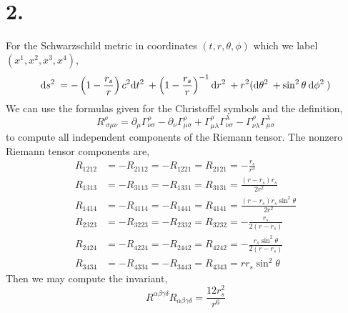 \documentclass[12pt]{article}
\begin{document}
\renewcommand{\sh}[1]{\left( 1 - \frac{r_s}{#1} \right)}

\section*{2.}

For the Schwarzschild metric in coordinates $(t, r, \theta, \phi)$ which we label $(x^1, x^2, x^3, x^4)$,
\[ \d{s^2} = - \sh{r} c^2 \d{t^2} + \sh{r}^{-1} \d{r^2} + r^2 (\d{\theta^2} + \sin^2{\theta} \: \d{\phi^2} ) \]
We can use the formulas given for the Christoffel symbols and the definition,
\[ R^\rho_{\: \sigma \mu \nu} = \partial_\mu \Gamma^{\rho}_{\nu \sigma} - \partial_\nu \Gamma^\rho_{\mu \sigma} + \Gamma^\rho_{\mu \lambda} \Gamma^\lambda_{\nu \sigma} - \Gamma^\rho_{\nu \lambda} \Gamma^\lambda_{\mu \sigma} \]
to compute all independent components of the Riemann tensor. The nonzero Riemann tensor components are,
\begin{align*}
R_{1212} & = -R_{2112} = - R_{1221} = R_{2121} = - \frac{r_s}{r^3} 
\\
R_{1313} & = -R_{3113} = - R_{1331} = R_{3131} = \frac{(r - r_s)r_s}{2 r^2} 
\\
R_{1414} & = -R_{4114} = - R_{1441} = R_{4141} = \frac{(r - r_s)r_s \sin^2{\theta}}{2 r^2}
\\
R_{2323} & = -R_{3223} = - R_{2332} = R_{3232} = - \frac{r_s}{2(r - r_s)}
\\
R_{2424} & = -R_{4224} = - R_{2442} = R_{4242} = - \frac{r_s \sin^2{\theta}}{2(r - r_s)}
\\
R_{3434} & = -R_{4334} = - R_{3443} = R_{4343} = r r_s \sin^2{\theta}
\end{align*}
Then we may compute the invariant,
\[ R^{\alpha \beta \gamma \delta} R_{\alpha \beta \gamma \delta} = \frac{12 r_s^2}{r^6} \]
\end{document}

